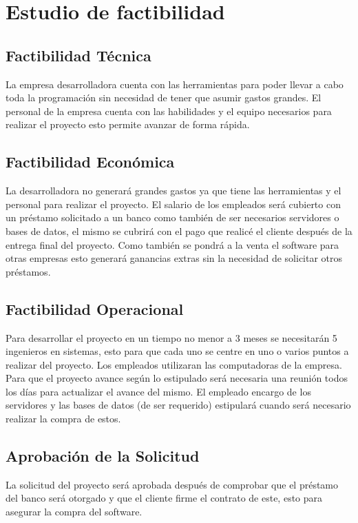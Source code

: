 \documentclass[conference]{IEEEtran}
\begin{document}
\section{Estudio de factibilidad}

\subsection{Factibilidad Técnica}
 
La empresa desarrolladora cuenta con las herramientas para poder llevar a cabo toda la programación sin necesidad de tener que asumir gastos grandes. El personal de la empresa cuenta con las habilidades y el equipo necesarios para realizar el proyecto esto permite avanzar de forma rápida.
\subsection{Factibilidad Económica}
La desarrolladora no generará grandes gastos ya que tiene las herramientas y el personal para realizar el proyecto. El salario de los empleados será cubierto con un préstamo solicitado a un banco como también de ser necesarios servidores o bases de datos, el mismo se cubrirá con el pago que realicé el cliente después de la entrega final del proyecto. Como también se pondrá a la venta el software para otras empresas esto generará ganancias extras sin la necesidad de solicitar otros préstamos. 
\subsection{Factibilidad Operacional} 
Para desarrollar el proyecto en un tiempo no menor a 3 meses se necesitarán 5 ingenieros en sistemas, esto para que cada uno se centre en uno o varios puntos a realizar del proyecto. Los empleados utilizaran las computadoras de la empresa. Para que el proyecto avance según lo estipulado será necesaria una reunión todos los días para actualizar el avance del mismo. El empleado encargo de los servidores y las bases de datos (de ser requerido) estipulará cuando será necesario realizar la compra de estos.
\subsection{Aprobación de la Solicitud}  
La solicitud del proyecto será aprobada después de comprobar que el préstamo del banco será otorgado y que el cliente firme el contrato de este, esto para asegurar la compra del software.
\end{document}
